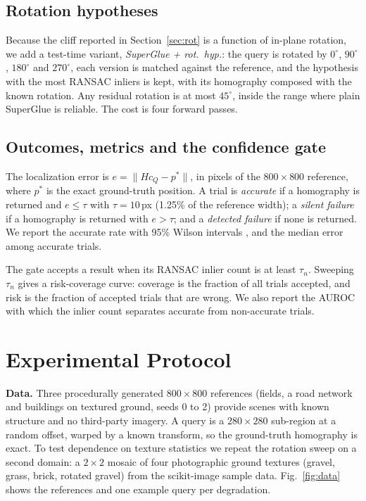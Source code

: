 \documentclass[conference]{IEEEtran}
\begin{document}
\subsection{Rotation hypotheses}
Because the cliff reported in Section~\ref{sec:rot} is a function of in-plane rotation, we add a test-time variant, \emph{SuperGlue + rot.\ hyp.}: the query is rotated by $0^\circ$, $90^\circ$, $180^\circ$ and $270^\circ$, each version is matched against the reference, and the hypothesis with the most RANSAC inliers is kept, with its homography composed with the known rotation. Any residual rotation is at most $45^\circ$, inside the range where plain SuperGlue is reliable. The cost is four forward passes.

\subsection{Outcomes, metrics and the confidence gate}
The localization error is $e=\lVert H c_Q - p^{*}\rVert$, in pixels of the $800\times800$ reference, where $p^{*}$ is the exact ground-truth position. A trial is \emph{accurate} if a homography is returned and $e\le\tau$ with $\tau=10$\,px (1.25\% of the reference width); a \emph{silent failure} if a homography is returned with $e>\tau$; and a \emph{detected failure} if none is returned. We report the accurate rate with 95\% Wilson intervals \cite{wilson1927probable}, and the median error among accurate trials.

The gate accepts a result when its RANSAC inlier count is at least $\tau_n$. Sweeping $\tau_n$ gives a risk-coverage curve: coverage is the fraction of all trials accepted, and risk is the fraction of accepted trials that are wrong. We also report the AUROC with which the inlier count separates accurate from non-accurate trials.

\section{Experimental Protocol}

\textbf{Data.} Three procedurally generated $800\times800$ references (fields, a road network and buildings on textured ground, seeds 0 to 2) provide scenes with known structure and no third-party imagery. A query is a $280\times280$ sub-region at a random offset, warped by a known transform, so the ground-truth homography is exact. To test dependence on texture statistics we repeat the rotation sweep on a second domain: a $2\times2$ mosaic of four photographic ground textures (gravel, grass, brick, rotated gravel) from the scikit-image sample data. Fig.~\ref{fig:data} shows the references and one example query per degradation.
\end{document}

